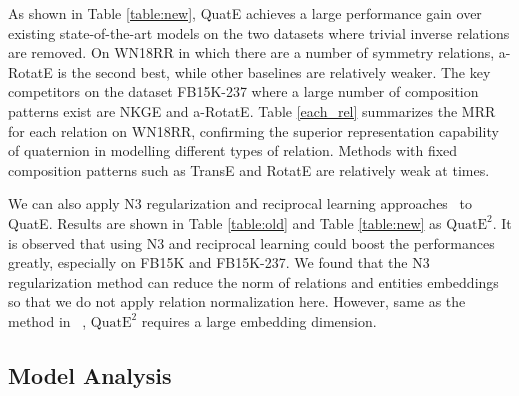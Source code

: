 \documentclass{article}
\begin{document}
As shown in Table \ref{table:new}, QuatE achieves a large performance gain over existing state-of-the-art models on the two datasets where trivial inverse relations are removed. On WN18RR in which there are a number of symmetry relations, a-RotatE is the second best, while other baselines are relatively weaker. The key competitors on the dataset FB15K-237 where a large number of composition patterns exist are NKGE and a-RotatE.  Table \ref{each_rel} summarizes the MRR for each relation on WN18RR, confirming the superior representation  capability of quaternion in modelling different types of relation. Methods with fixed composition patterns such as TransE and RotatE are relatively weak at times.



We can also apply N3 regularization and reciprocal learning approaches~\citep{lacroix2018canonical} to QuatE. Results are shown in Table  \ref{table:old} and Table \ref{table:new} as $\text{QuatE}^2$.  It is observed that using N3 and reciprocal learning could boost the performances greatly, especially on FB15K and FB15K-237. We found that the N3 regularization method can reduce the norm of relations and entities embeddings so that we do not apply relation normalization here. However, same as the method in ~\citep{lacroix2018canonical}, $\text{QuatE}^2$ requires a large embedding dimension.




\subsection{Model Analysis}
\end{document}

